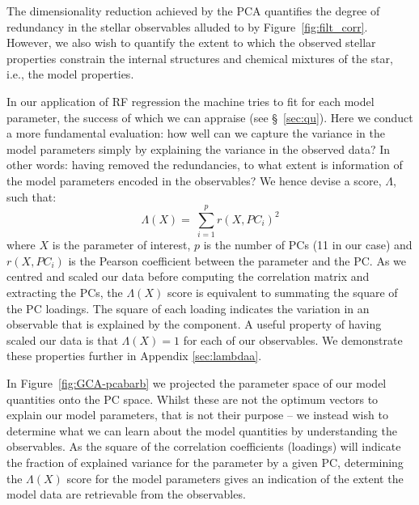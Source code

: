 The dimensionality reduction achieved by the PCA quantifies the degree of redundancy in the stellar observables alluded to by Figure~\ref{fig:filt_corr}. 
However, we also wish to quantify the extent to which the observed stellar properties constrain the internal structures and chemical mixtures of the star, i.e., the model properties. 


In our application of RF regression the machine tries to fit for each model parameter, the success of which we can appraise (see \S~\ref{sec:qu}). 
Here we conduct a more fundamental evaluation: how well can we capture the variance in the model parameters simply by explaining the variance in the observed data? 
In other words: having removed the redundancies, to what extent is information of the model parameters encoded in the observables? We hence devise a score, $\Lambda$, such that:
\begin{equation}
   \Lambda(X) = \  \sum^{p}_{i=1}  r(X, PC_i)^2
\end{equation}
where $X$ is the parameter of interest, $p$ is the number of PCs (11 in our case)  and  $r(X, PC_i)$ is the Pearson coefficient between the parameter and the PC.
As we centred and scaled our data before computing the correlation matrix and extracting the PCs, 
 the $\Lambda(X)$ score is equivalent to summating the square of the PC loadings. The square of each loading indicates the variation in an observable that is explained by the component. A useful property of having scaled our data is that $\Lambda(X) =1$  for each of our observables. We demonstrate these properties further in Appendix \ref{sec:lambdaa}.

In Figure~\ref{fig:GCA-pcabarb} we projected the parameter space of our model quantities onto the PC space.  Whilst these are not the optimum vectors to explain our model parameters, that is not their purpose -- we instead wish to determine what we can learn about the model quantities by understanding the observables. 
As the square of the correlation coefficients (loadings) will indicate the fraction of explained variance for the parameter by a given PC, determining the  
$\Lambda(X)$ score for the model parameters gives an indication of the extent the model data are retrievable from the observables.  

